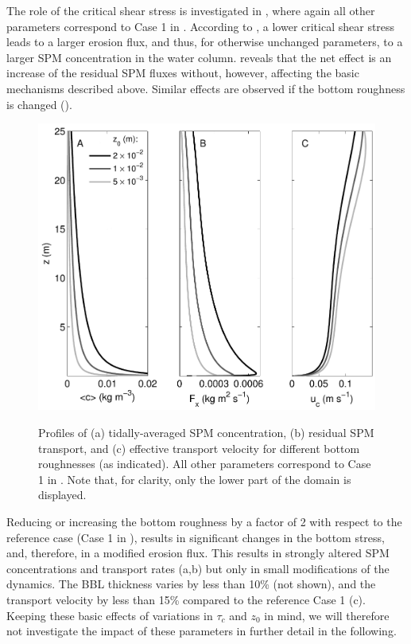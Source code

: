 The role of the critical shear stress is investigated in
, where again all other parameters correspond to Case
1 in . According to , a lower critical shear
stress leads to a larger erosion flux, and thus, for otherwise
unchanged parameters, to a larger SPM concentration in the water
column.  reveals that the net effect is an increase
of the residual SPM fluxes without, however, affecting the basic
mechanisms described above. Similar effects are observed if the bottom
roughness is changed (). 
\begin{figure}[h]
  \noindent\includegraphics[width=30pc,angle=0]{bilder/bodenz.pdf}\\
  \caption{Profiles of (a) tidally-averaged SPM concentration, (b)
    residual SPM transport, and (c) effective transport velocity for
    different bottom roughnesses (as indicated). All other parameters
    correspond to Case 1 in . Note that, for clarity, only
    the lower part of the domain is displayed.}\label{roughness}
\end{figure}

Reducing or increasing the
bottom roughness by a factor of 2 with respect to the reference case
(Case 1 in ), results in significant changes in the bottom
stress, and, therefore, in a modified erosion flux. This results in
strongly altered SPM concentrations and transport rates
(a,b) but only in small modifications of the
dynamics. The BBL thickness varies by less than 10\% (not shown), and
the transport velocity by less than 15\% compared to the reference
Case 1 (c). Keeping these basic effects of variations
in $\tau_c$ and $z_0$ in mind, we will therefore not investigate the
impact of these parameters in further detail in the following.

